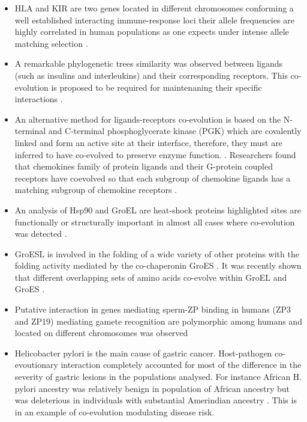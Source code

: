 \begin{itemize}

\item HLA and KIR are two genes located in different chromosomes conforming a well established interacting immune-response loci their allele frequencies are highly correlated in human populations as one expects under intense allele matching selection \cite{rohlfs2010detecting:REF}.

\item A remarkable phylogenetic trees similarity was observed between ligands (such as insulins and interleukins) and their corresponding receptors.
This co‐evolution is proposed to be required for maintenaning their specific interactions \cite{de2013emerging:REF}.

\item An alternative method for ligands-receptors co-evolution is based on the N-terminal and C-terminal phosphoglycerate kinase (PGK) which are covalently linked and form an active site at their interface, therefore, they must are inferred to have co-evolved to preserve enzyme function. \cite{goh2000co}.
Researchers found that chemokines family of protein ligands and their G-protein coupled receptors have coevolved so that each subgroup of chemokine ligands has a matching subgroup of chemokine receptors \cite{goh2000co}.

\item An analysis of Hsp90 and GroEL are heat-shock proteins highlighted sites are functionally or structurally important in almost all cases where co-evolution was detected \cite{fares2006novel}.

\item GroESL is involved in the folding of a wide variety of other proteins with the folding activity mediated by the co-chaperonin GroES  \cite{ruiz2013coevolution}.
It was recently shown that different overlapping sets of amino acids co-evolve within GroEL and GroES \cite{ruiz2013coevolution}.

\item Putative interaction in genes mediating sperm-ZP binding in humans (ZP3 and ZP19) mediating gamete recognition are polymorphic among humans and located on different chromosomes was observed \cite{rohlfs2010detecting}

\item Helicobacter pylori is the main cause of gastric cancer. Host-pathogen co-evoutionary interaction completely accounted for most of the difference in the severity of gastric lesions in the populations analysed. For instance African H. pylori ancestry was relatively benign in population of African ancestry but was deleterious in individuals with substantial Amerindian ancestry \cite{kodaman2014human}.
This is in an example of co-evolution modulating disease risk.

\end{itemize}

